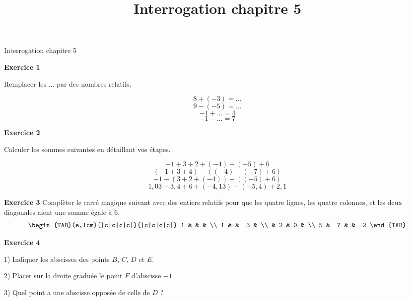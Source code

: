 \documentclass[14pt]{extreport}
\title{Interrogation chapitre 5}
\date{}
\theoremstyle{plain}
\begin{document}
\begin{center}{\Large Interrogation chapitre 5}\end{center}



\textbf{Exercice 1}  %

Remplacer les $\ldots$ par des nombres relatifs. 

\[ 8 + (-3) =\ldots \]
\[ 9 - (-5) = \ldots \]
\[ -1 + \ldots = 4 \]
\[ -1 - \ldots = 7 \]

\textbf{Exercice 2} %

Calculer les sommes suivantes en détaillant vos étapes. 

\[ -1  + 3 + 2 + (-4) + (-5) + 6 \]
\[ (-1  + 3 + 4) - ((-4) + (-7) + 6 )\]
\[ -1  - ( 3 + 2 + (-4) ) - ((-5) + 6) \]
\[ 1,03  + 3,4 + 6 + (-4,13)   + (-5,4) + 2,1  \]




\textbf{Exercice 3} %
Complèter le carré magique suivant avec des entiers relatifs pour que les quatre lignes, les quatre colonnes, 
et les deux diagonales aient une somme égale à $6$. 
\[
\begin{TAB}(e,1cm){|c|c|c|c|}{|c|c|c|c|}
    1 & & &  \\
    1 &  & -3 &  \\
      & 2 & 0 & \\
    5  & -7 &  & -2
\end{TAB}
\]



\newpage

\textbf{Exercice 4} 
 
1) Indiquer les abscisses des points $B$, $C$, $D$ et $E$.
 
2) Placer sur la droite graduée le point $F$ d'abscisse $-1$. 

3) Quel point a une abscisse opposée de celle de $D$ ? 
 \begin{figure}[H]\center
{}
\end{figure}
\end{document}
